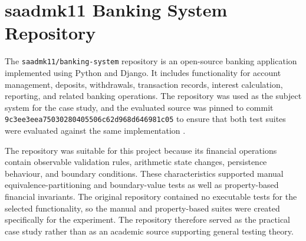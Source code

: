 \documentclass[12pt]{article}
\begin{document}
\section{saadmk11 Banking System Repository}

The \texttt{saadmk11/banking-system} repository is an open-source banking
application implemented using Python and Django. It includes functionality for
account management, deposits, withdrawals, transaction records, interest
calculation, reporting, and related banking operations. The repository was
used as the subject system for the case study, and the evaluated source was
pinned to commit
\texttt{9c3ee3eea75030280405506c62d968d646981c05}
to ensure that both test suites were evaluated against the same implementation
\cite{bankingsystem}.

The repository was suitable for this project because its financial operations
contain observable validation rules, arithmetic state changes, persistence
behaviour, and boundary conditions. These characteristics supported manual
equivalence-partitioning and boundary-value tests as well as property-based
financial invariants. The original repository contained no executable tests
for the selected functionality, so the manual and property-based suites were
created specifically for the experiment. The repository therefore served as
the practical case study rather than as an academic source supporting general
testing theory.

\clearpage



\end{document}
